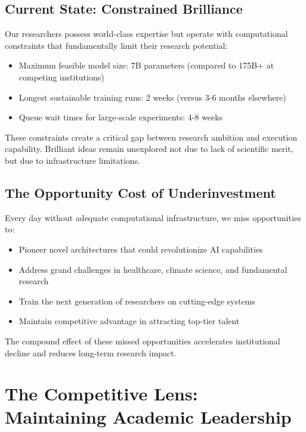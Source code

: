 \documentclass{article}
\begin{document}
\subsection{Current State: Constrained Brilliance}

Our researchers possess world-class expertise but operate with computational constraints that fundamentally limit their research potential:

\begin{itemize}
\item Maximum feasible model size: 7B parameters (compared to 175B+ at competing institutions)
\item Longest sustainable training runs: 2 weeks (versus 3-6 months elsewhere)
\item Queue wait times for large-scale experiments: 4-8 weeks
\end{itemize}

These constraints create a critical gap between research ambition and execution capability. Brilliant ideas remain unexplored not due to lack of scientific merit, but due to infrastructure limitations.

\subsection{The Opportunity Cost of Underinvestment}

Every day without adequate computational infrastructure, we miss opportunities to:

\begin{itemize}
\item Pioneer novel architectures that could revolutionize AI capabilities
\item Address grand challenges in healthcare, climate science, and fundamental research
\item Train the next generation of researchers on cutting-edge systems
\item Maintain competitive advantage in attracting top-tier talent
\end{itemize}

The compound effect of these missed opportunities accelerates institutional decline and reduces long-term research impact.

\section{The Competitive Lens: Maintaining Academic Leadership}
\end{document}
